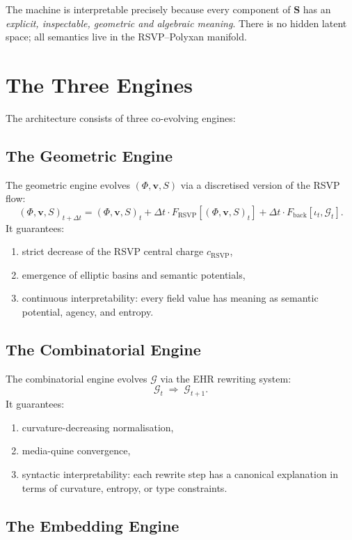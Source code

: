 The machine is interpretable precisely because every component of
$\mathbf{S}$ has an \emph{explicit, inspectable, geometric and algebraic meaning}.
There is no hidden latent space; all semantics live in the RSVP--Polyxan manifold.

\section{The Three Engines}

The architecture consists of three co-evolving engines:

\subsection{The Geometric Engine}

The geometric engine evolves $(\Phi,\mathbf{v},S)$ via a discretised
version of the RSVP flow:
\[
  (\Phi,\mathbf{v},S)_{t+\Delta t}
    = (\Phi,\mathbf{v},S)_t
      + \Delta t \cdot F_{\mathrm{RSVP}}[(\Phi,\mathbf{v},S)_t]
      + \Delta t \cdot F_{\mathrm{back}}[\iota_t,\mathcal{G}_t].
\]
It guarantees:
\begin{enumerate}
\item strict decrease of the RSVP central charge $c_{\mathrm{RSVP}}$,
\item emergence of elliptic basins and semantic potentials,
\item continuous interpretability: every field value has meaning
      as semantic potential, agency, and entropy.
\end{enumerate}

\subsection{The Combinatorial Engine}

The combinatorial engine evolves $\mathcal{G}$ via the
EHR rewriting system:
\[
   \mathcal{G}_t \;\Rightarrow\; \mathcal{G}_{t+1}.
\]
It guarantees:
\begin{enumerate}
\item curvature-decreasing normalisation,
\item media-quine convergence,
\item syntactic interpretability: each rewrite step has a canonical
      explanation in terms of curvature, entropy, or type constraints.
\end{enumerate}

\subsection{The Embedding Engine}

